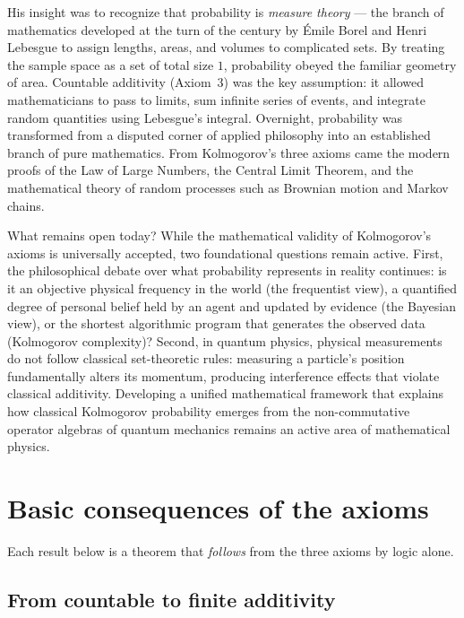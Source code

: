 \begin{historybox}
His insight was to recognize that probability is \emph{measure
theory} --- the branch of mathematics developed at the turn of the century by
\'Emile Borel and Henri Lebesgue to assign lengths, areas, and volumes to
complicated sets. By treating the sample space as a set of total size $1$,
probability obeyed the familiar geometry of area. Countable
additivity (Axiom~3) was the key assumption: it allowed mathematicians to pass
to limits, sum infinite series of events, and integrate random quantities
using Lebesgue's integral. Overnight, probability was transformed
from a disputed corner of applied philosophy into an established branch of
pure mathematics. From Kolmogorov's three axioms came the modern proofs of
the Law of Large Numbers, the Central Limit Theorem, and the mathematical
theory of random processes such as Brownian motion and Markov chains.

What remains open today? While the mathematical validity of Kolmogorov's
axioms is universally accepted, two foundational questions remain active.
First, the philosophical debate over what probability represents in
reality continues: is it an objective physical frequency in the world (the
frequentist view), a quantified degree of personal belief held by an agent and
updated by evidence (the Bayesian view), or the shortest algorithmic program
that generates the observed data (Kolmogorov complexity)? Second, in quantum
physics, physical measurements do not follow classical set-theoretic rules:
measuring a particle's position fundamentally alters its momentum, producing
interference effects that violate classical additivity. Developing a unified
mathematical framework that explains how classical Kolmogorov probability
emerges from the non-commutative operator algebras of quantum mechanics
remains an active area of mathematical physics.
\end{historybox}

\section{Basic consequences of the axioms}
\label{ch03:consequences}

Each result below is a theorem that \emph{follows} from the
three axioms by logic alone.

\subsection{From countable to finite additivity}
\label{ch03:finite-add}

